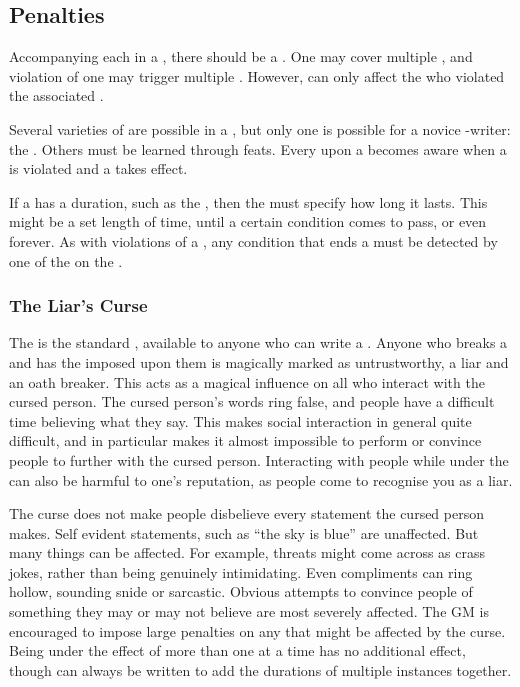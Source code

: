 \subsection{Penalties}

Accompanying each {\stipulation} in a {\contract}, there should be a {\contractpenalty}.
One {\contractpenalty} may cover multiple {\stipulations}, and violation of one {\stipulation} may trigger multiple {\penalties}.
However, {\penalties} can only affect the {\signatories} who violated the associated {\stipulations}.

Several varieties of {\contractpenalty} are possible in a {\contract}, but only one is possible for a novice {\contract}-writer: the {\liarscurse}.
Others must be learned through feats.
Every {\signatory} upon a {\contract} becomes aware when a {\stipulation} is violated and a {\contractpenalty} takes effect.

If a {\contractpenalty} has a duration, such as the {\liarscurse}, then the {\contract} must specify how long it lasts.
This might be a set length of time, until a certain condition comes to pass, or even forever.
As with violations of a {\stipulation}, any condition that ends a {\contractpenalty} must be detected by one of the {\signatories} on the {\contract}.

\subsubsection{The Liar's Curse}

The {\liarscurse} is the standard {\contractpenalty}, available to anyone who can write a {\contract}.
Anyone who breaks a {\contract} and has the {\liarscurse} imposed upon them is magically marked as untrustworthy, a liar and an oath breaker.
This acts as a magical influence on all who interact with the cursed person.
The cursed person's words ring false, and people have a difficult time believing what they say.
This makes social interaction in general quite difficult, and in particular makes it almost impossible to perform  or convince people to {\sign} further {\contracts} with the cursed person.
Interacting with people while under the {\liarscurse} can also be harmful to one's reputation, as people come to recognise you as a liar.

The curse does not make people disbelieve every statement the cursed person makes.
Self evident statements, such as ``the sky is blue'' are unaffected.
But many things can be affected.
For example, threats might come across as crass jokes, rather than being genuinely intimidating.
Even compliments can ring hollow, sounding snide or sarcastic.
Obvious attempts to convince people of something they may or may not believe are most severely affected.
The GM is encouraged to impose large penalties on any {\tests} that might be affected by the curse.
Being under the effect of more than one {\liarscurse} at a time has no additional effect, though {\contracts} can always be written to add the durations of multiple instances together.


